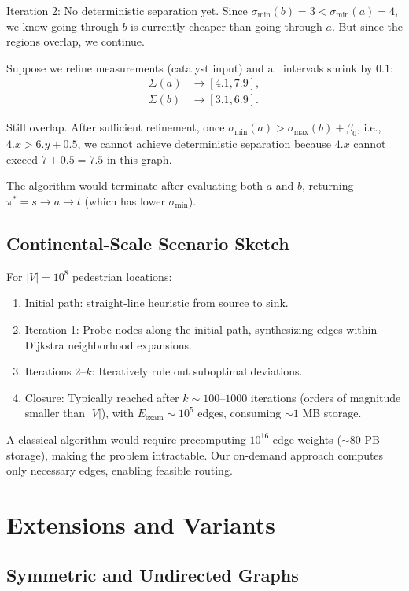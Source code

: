 \documentclass[twocolumn,11pt,a4paper]{article}
\theoremstyle{definition}
\begin{document}
Iteration 2: No deterministic separation yet. Since $\sigma_{\min}(b) = 3 < \sigma_{\min}(a) = 4$, we know going through $b$ is currently cheaper than going through $a$. But since the regions overlap, we continue.

Suppose we refine measurements (catalyst input) and all intervals shrink by $0.1$:
\begin{align}
\Sigma(a) &\to [4.1, 7.9], \\
\Sigma(b) &\to [3.1, 6.9].
\end{align}

Still overlap. After sufficient refinement, once $\sigma_{\min}(a) > \sigma_{\max}(b) + \beta_0$, i.e., $4.x > 6.y + 0.5$, we cannot achieve deterministic separation because $4.x$ cannot exceed $7 + 0.5 = 7.5$ in this graph.

The algorithm would terminate after evaluating both $a$ and $b$, returning $\pi^* = s \to a \to t$ (which has lower $\sigma_{\min}$).

\subsection{Continental-Scale Scenario Sketch}

For $|V| = 10^8$ pedestrian locations:
\begin{enumerate}
\item Initial path: straight-line heuristic from source to sink.
\item Iteration 1: Probe nodes along the initial path, synthesizing edges within Dijkstra neighborhood expansions.
\item Iterations 2--$k$: Iteratively rule out suboptimal deviations.
\item Closure: Typically reached after $k \sim 100$--$1000$ iterations (orders of magnitude smaller than $|V|$), with $E_{\text{exam}} \sim 10^5$ edges, consuming $\sim 1$ MB storage.
\end{enumerate}

A classical algorithm would require precomputing $10^{16}$ edge weights ($\sim 80$ PB storage), making the problem intractable. Our on-demand approach computes only necessary edges, enabling feasible routing.

\section{Extensions and Variants}

\subsection{Symmetric and Undirected Graphs}
\end{document}
